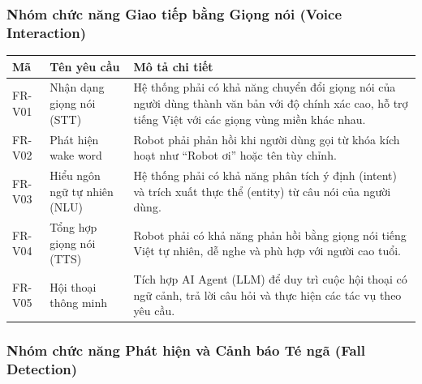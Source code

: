 \subsubsection{Nhóm chức năng Giao tiếp bằng Giọng nói (Voice Interaction)}

\begin{table}[h!]
\centering
\label{tab:req-voice}
\begin{tabular}{|L{1.5cm}|L{3.5cm}|L{8.5cm}|}
\hline
\textbf{Mã} & \textbf{Tên yêu cầu} & \textbf{Mô tả chi tiết} \\
\hline
FR-V01 & Nhận dạng giọng nói (STT) & Hệ thống phải có khả năng chuyển đổi giọng nói của người dùng thành văn bản với độ chính xác cao, hỗ trợ tiếng Việt với các giọng vùng miền khác nhau. \\
\hline
FR-V02 & Phát hiện wake word & Robot phải phản hồi khi người dùng gọi từ khóa kích hoạt như ``Robot ơi'' hoặc tên tùy chỉnh. \\
\hline
FR-V03 & Hiểu ngôn ngữ tự nhiên (NLU) & Hệ thống phải có khả năng phân tích ý định (intent) và trích xuất thực thể (entity) từ câu nói của người dùng. \\
\hline
FR-V04 & Tổng hợp giọng nói (TTS) & Robot phải có khả năng phản hồi bằng giọng nói tiếng Việt tự nhiên, dễ nghe và phù hợp với người cao tuổi. \\
\hline
FR-V05 & Hội thoại thông minh & Tích hợp AI Agent (LLM) để duy trì cuộc hội thoại có ngữ cảnh, trả lời câu hỏi và thực hiện các tác vụ theo yêu cầu. \\
\hline
\end{tabular}
\end{table}

\newpage
\subsubsection{Nhóm chức năng Phát hiện và Cảnh báo Té ngã (Fall Detection)}

